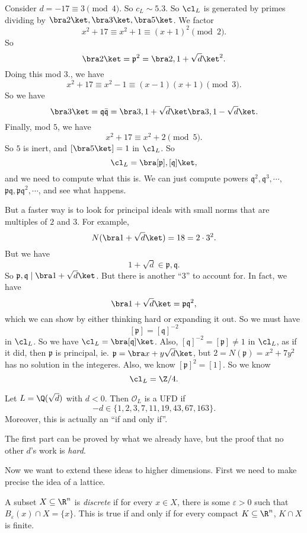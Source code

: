 \documentclass[a4paper]{article}
\begin{document}
\begin{eg}
  Consider $d = -17 \equiv 3 \pmod 4$. So $c_L \sim 5.3$. So $\cl_L$ is generated by primes dividing by $\bra 2\ket, \bra 3\ket, \bra 5\ket$. We factor
  \[
    x^2 + 17 \equiv x^2 + 1 \equiv (x + 1)^2 \pmod 2.
  \]
  So
  \[
    \bra 2\ket = \mathfrak{p}^2 = \bra 2, 1 + \sqrt{d}\ket^2.
  \]
  Doing this mod $3$., we have
  \[
    x^2 + 17 \equiv x^2 - 1 \equiv (x - 1)(x + 1) \pmod 3.
  \]
  So we have
  \[
    \bra 3\ket = \mathfrak{q}\bar{\mathfrak{q}} = \bra 3, 1 + \sqrt{d}\ket \bra 3, 1 - \sqrt{d}\ket.
  \]
  Finally, mod $5$, we have
  \[
    x^2 + 17 \equiv x^2 + 2 \pmod 5.
  \]
  So $5$ is inert, and $[\bra 5\ket] = 1$ in $\cl_L$. So
  \[
    \cl_L = \bra [\mathfrak{p}], [\mathfrak{q}]\ket,
  \]
  and we need to compute what this is. We can just compute powers $\mathfrak{q}^2, \mathfrak{q}^3, \cdots$, $\mathfrak{p}\mathfrak{q}, \mathfrak{p}\mathfrak{q}^2, \cdots$, and see what happens.

  But a faster way is to look for principal ideals with small norms that are multiples of $2$ and $3$. For example,
  \[
    N(\bra 1 + \sqrt{d}\ket) = 18 = 2 \cdot 3^2.
  \]
  But we have
  \[
    1 + \sqrt{d} \in \mathfrak{p}, \mathfrak{q}.
  \]
  So $\mathfrak{p}, \mathfrak{q} \mid \bra 1 + \sqrt{d}\ket$. But there is another ``$3$'' to account for. In fact, we have
  \[
    \bra 1 + \sqrt{d}\ket = \mathfrak{p}\mathfrak{q}^2,
  \]
  which we can show by either thinking hard or expanding it out. So we must have
  \[
    [\mathfrak{p}] = [\mathfrak{q}]^{-2}
  \]
  in $\cl_L$. So we have $\cl_L = \bra [\mathfrak{q}]\ket$. Also, $[\mathfrak{q}]^{-2} = [\mathfrak{p}] \not= 1$ in $\cl_L$, as if it did, then $\mathfrak{p}$ is principal, ie. $\mathfrak{p} = \bra x + y\sqrt{d}\ket$, but $2 = N(\mathfrak{p}) = x^2 + 7y^2$ has no solution in the integeres. Also, we know $[\mathfrak{p}]^2 = [1]$. So we know
  \[
    \cl_L = \Z/4.
  \]
\end{eg}

\begin{thm}
  Let $L = \Q(\sqrt{d})$ with $d < 0$. Then $\mathcal{O}_L$ is a UFD if
  \[
    -d \in \{1, 2, 3, 7, 11, 19, 43, 67, 163\}.
  \]
  Moreover, this is actually an ``if and only if''.
\end{thm}
The first part can be proved by what we already have, but the proof that no other $d$'s work is \emph{hard}.

Now we want to extend these ideas to higher dimensions. First we need to make precise the idea of a lattice.
\begin{defi}
  A subset $X \subseteq \R^n$ is \emph{discrete} if for every $x \in X$, there is some $\varepsilon > 0$ such that $B_\varepsilon(x) \cap X = \{x\}$. This is true if and only if for every compact $K \subseteq \R^n$, $K\cap X$ is finite.
\end{defi}
\end{document}

